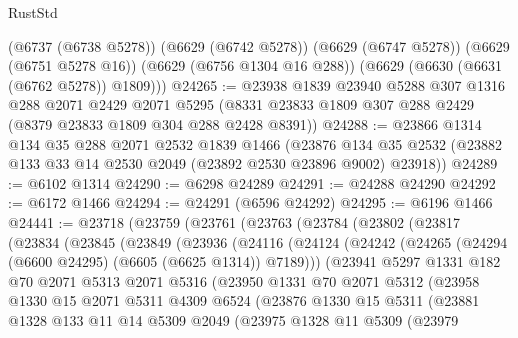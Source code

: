 \begin{lexlean}{RustStd}
\begin{coremodule}
      (@6737 (@6738 @5278))
      (@6629 (@6742 @5278))
      (@6629 (@6747 @5278))
      (@6629 (@6751 @5278 @16))
      (@6629 (@6756 @1304 @16 @288))
      (@6629 (@6630 (@6631 (@6762 @5278)) @1809)))
@24265 := @23938
    @1839
    @23940
    @5288
    @307
    @1316
    @288
    @2071
    @2429
    @2071
    @5295
    (@8331 @23833 @1809 @307 @288 @2429 (@8379 @23833 @1809 @304 @288 @2428 @8391))
@24288 := @23866
    @1314
    @134
    @35
    @288
    @2071
    @2532
    @1839
    @1466
    (@23876 @134 @35 @2532 (@23882 @133 @33 @14 @2530 @2049 (@23892 @2530 @23896 @9002) @23918))
@24289 := @6102 @1314
@24290 := @6298 @24289
@24291 := @24288 @24290
@24292 := @6172 @1466
@24294 := @24291 (@6596 @24292)
@24295 := @6196 @1466
@24441 := @23718
    (@23759
      (@23761
        (@23763
          (@23784
            (@23802
              (@23817
                (@23834
                  (@23845
                    (@23849
                      (@23936
                        (@24116
                          (@24124
                            (@24242 (@24265 (@24294 (@6600 @24295) (@6605 (@6625 @1314)) @7189)))
                            (@23941
                              @5297
                              @1331
                              @182
                              @70
                              @2071
                              @5313
                              @2071
                              @5316
                              (@23950
                                @1331
                                @70
                                @2071
                                @5312
                                (@23958
                                  @1330
                                  @15
                                  @2071
                                  @5311
                                  @4309
                                  @6524
                                  (@23876
                                    @1330
                                    @15
                                    @5311
                                    (@23881
                                      @1328
                                      @133
                                      @11
                                      @14
                                      @5309
                                      @2049
                                      (@23975
                                        @1328
                                        @11
                                        @5309
                                        (@23979

\end{coremodule}
\end{lexlean}
